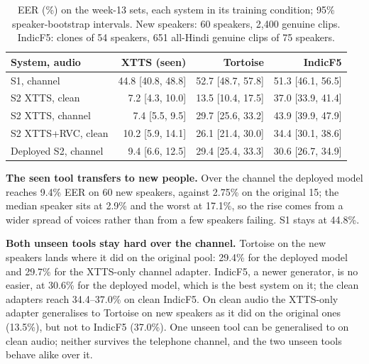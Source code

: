\begin{table}[t]
\centering
\caption{EER (\%) on the week-13 sets, each system in its training condition; 95\%
speaker-bootstrap intervals. New speakers: 60 speakers, 2{,}400 genuine clips.
IndicF5: clones of 54 speakers, 651 all-Hindi genuine clips of 75 speakers.}
\label{tab:new}
\footnotesize
\setlength{\tabcolsep}{3pt}
\begin{tabular}{@{}lrrr@{}}
\toprule
System, audio & XTTS (seen) & Tortoise & IndicF5 \\
\midrule
S1, channel & 44.8 {\scriptsize[40.8, 48.8]} & 52.7 {\scriptsize[48.7, 57.8]} & 51.3 {\scriptsize[46.1, 56.5]} \\
S2 XTTS, clean & 7.2 {\scriptsize[4.3, 10.0]} & 13.5 {\scriptsize[10.4, 17.5]} & 37.0 {\scriptsize[33.9, 41.4]} \\
S2 XTTS, channel & 7.4 {\scriptsize[5.5, 9.5]} & 29.7 {\scriptsize[25.6, 33.2]} & 43.9 {\scriptsize[39.9, 47.9]} \\
S2 XTTS+RVC, clean & 10.2 {\scriptsize[5.9, 14.1]} & 26.1 {\scriptsize[21.4, 30.0]} & 34.4 {\scriptsize[30.1, 38.6]} \\
Deployed S2, channel & 9.4 {\scriptsize[6.6, 12.5]} & 29.4 {\scriptsize[25.4, 33.3]} & 30.6 {\scriptsize[26.7, 34.9]} \\
\bottomrule
\end{tabular}
\end{table}

\textbf{The seen tool transfers to new people.} Over the channel the deployed model
reaches 9.4\% EER on 60 new speakers, against 2.75\% on the original 15; the median
speaker sits at 2.9\% and the worst at 17.1\%, so the rise comes from a wider spread of
voices rather than from a few speakers failing. S1 stays at 44.8\%.

\textbf{Both unseen tools stay hard over the channel.} Tortoise on the new speakers
lands where it did on the original pool: 29.4\% for the deployed model and 29.7\% for
the XTTS-only channel adapter. IndicF5, a newer generator, is no easier, at 30.6\%
for the deployed model, which is the best system on it; the clean adapters reach
34.4--37.0\% on clean IndicF5. On clean audio the XTTS-only adapter generalises to
Tortoise on new speakers as it did on the original ones (13.5\%), but not to IndicF5
(37.0\%). One unseen tool can be generalised to on clean audio; neither survives the
telephone channel, and the two unseen tools behave alike over it.

